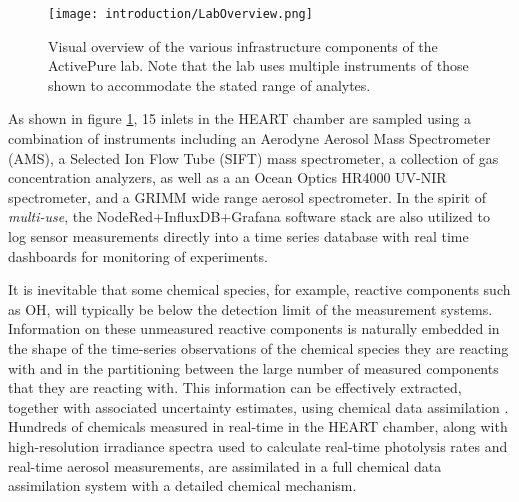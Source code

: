 \begin{figure}[h]
  \centering
  \texttt{[image: introduction/LabOverview.png]}
	\caption{Visual overview of the various infrastructure components of the ActivePure lab. Note that the lab uses multiple instruments of those shown to accommodate the stated range of analytes.}
	\label{Figure.InstrumentOverview}
\end{figure}
As shown in figure \ref{Figure.InstrumentOverview}, 15 inlets in the HEART chamber are sampled using a combination of instruments including an Aerodyne Aerosol Mass Spectrometer (AMS), a Selected Ion Flow Tube (SIFT) mass spectrometer, a collection of gas concentration analyzers, as well as a an Ocean Optics HR4000 UV-NIR spectrometer, and a GRIMM wide range aerosol spectrometer. In the spirit of \textit{multi-use}, the NodeRed+InfluxDB+Grafana software stack are also utilized to log sensor measurements directly into a time series database with real time dashboards for monitoring of experiments.

It is inevitable that some chemical species, for example, reactive components such as $\mathrm{OH}$, will typically be below the detection limit of the measurement systems. Information on these unmeasured reactive components is naturally embedded in the shape of the time-series observations of the chemical species they are reacting with and in the partitioning between the large number of measured components that they are reacting with. This information can be effectively extracted, together with associated uncertainty estimates, using chemical data assimilation \cite{ISI:A1995TA29300008, Lary1999a, Lary2003a}. Hundreds of chemicals measured in real-time in the HEART chamber, along with high-resolution irradiance spectra used to calculate real-time photolysis rates and real-time aerosol measurements, are assimilated in a full chemical data assimilation system with a detailed chemical mechanism.







